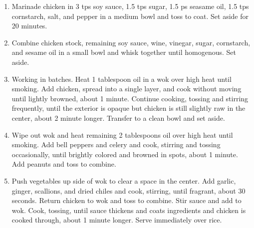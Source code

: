 \documentclass[]{report}
\begin{document}
            {\begin{enumerate}    %
                  \item  Marinade chicken in 3 tps soy sauce, 1.5 tps sugar, 1.5 ps seasame oil, 1.5 tps cornstarch, salt, and pepper in a medium bowl and toss to coat. Set aside for 20 minutes.
                  \item  Combine chicken stock, remaining soy sauce, wine, vinegar, sugar, cornstarch, and sesame oil in a small bowl and whisk together until homogenous. Set aside. 
                  \item Working in batches. Heat 1 tablespoon oil in a wok over high heat until smoking. Add chicken, spread into a single layer, and cook without moving until lightly browned, about 1 minute. Continue cooking, tossing and stirring frequently, until the exterior is opaque but chicken is still slightly raw in the center, about 2 minute longer. Transfer to a clean bowl and set aside.
                  \item Wipe out wok and heat remaining 2 tablespoons oil over high heat until smoking. Add bell peppers and celery and cook, stirring and tossing occasionally, until brightly colored and browned in spots, about 1 minute. Add peanuts and toss to combine. 
                  \item Push vegetables up side of wok to clear a space in the center. Add garlic, ginger, scallions, and dried chiles and cook, stirring, until fragrant, about 30 seconds. Return chicken to wok and toss to combine. Stir sauce and add to wok. Cook, tossing, until sauce thickens and coats ingredients and chicken is cooked through, about 1 minute longer. Serve immediately over rice. 
            \end{enumerate}}
\end{document}

